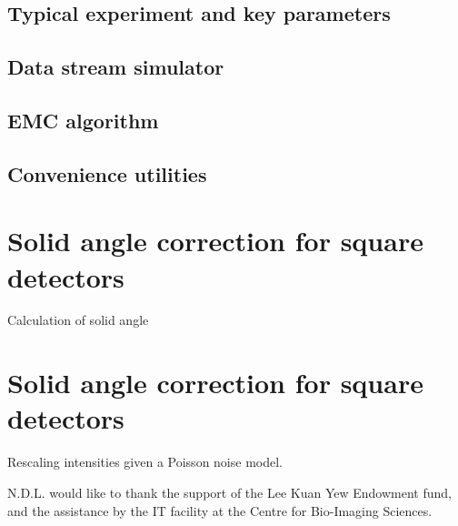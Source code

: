 \documentclass[preprint]{iucr}              %
\begin{document}
\subsection{Typical experiment and key parameters}

\subsection{Data stream simulator}

\subsection{EMC algorithm}

\subsection{Convenience utilities}

\appendix
\section{Solid angle correction for square detectors}
Calculation of solid angle 

\section{Solid angle correction for square detectors}
Rescaling intensities given a Poisson noise model.



N.D.L. would like to thank the support of the Lee Kuan Yew Endowment fund, and the assistance by the IT facility at the Centre for Bio-Imaging Sciences.

\begin{references}
\end{references}

\end{document}

